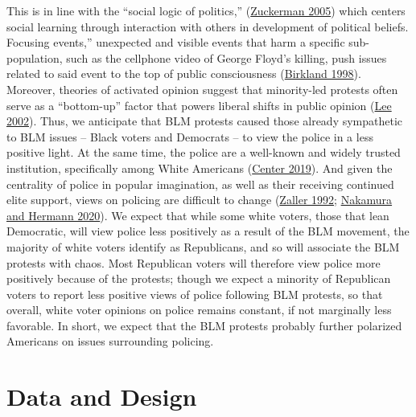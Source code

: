 \documentclass[
  12pt,
]{article}
\begin{document}
This is in line with the ``social logic of politics,'' (\protect\hyperlink{ref-Zuckerman2005}{Zuckerman 2005}) which centers social learning through interaction with others in development of political beliefs. Focusing events,'' unexpected and visible events that harm a specific sub-population, such as the cellphone video of George Floyd's killing, push issues related to said event to the top of public consciousness (\protect\hyperlink{ref-Birkland1998}{Birkland 1998}). Moreover, theories of activated opinion suggest that minority-led protests often serve as a ``bottom-up'' factor that powers liberal shifts in public opinion (\protect\hyperlink{ref-Lee2002}{Lee 2002}). Thus, we anticipate that BLM protests caused those already sympathetic to BLM issues -- Black voters and Democrats -- to view the police in a less positive light.
At the same time, the police are a well-known and widely trusted institution, specifically among White Americans (\protect\hyperlink{ref-PewResearchCenter2019}{Center 2019}). And given the centrality of police in popular imagination, as well as their receiving continued elite support, views on policing are difficult to change (\protect\hyperlink{ref-Zaller1992}{Zaller 1992}; \protect\hyperlink{ref-Nakamura2020}{Nakamura and Hermann 2020}). We expect that while some white voters, those that lean Democratic, will view police less positively as a result of the BLM movement, the majority of white voters identify as Republicans, and so will associate the BLM protests with chaos. Most Republican voters will therefore view police more positively because of the protests; though we expect a minority of Republican voters to report less positive views of police following BLM protests, so that overall, white voter opinions on police remains constant, if not marginally less favorable. In short, we expect that the BLM protests probably further polarized Americans on issues surrounding policing.

\hypertarget{data-and-design}{%
\section*{Data and Design}\label{data-and-design}}
\end{document}
